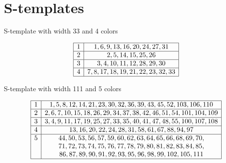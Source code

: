 \documentclass{article}
\newtheorem{computational theorem}[definition]{Computational Theorem}
\begin{document}
\appendix

\section{S-templates}
\label{S-templates}

\begin{table}[H]
{\footnotesize
	\caption{S-template with width 33 and 4 colors}}
\begin{center}
\begin{small}
\[
\begin{array}{|*{2}{c|}}
	\hline
	1 & 1, 6, 9, 13, 16, 20, 24, 27, 31 \\
	\hline
	2 & 2, 5, 14, 15, 25, 26 \\
	\hline
	3 & 3, 4, 10, 11, 12, 28, 29, 30 \\
	\hline
	4 & 7, 8, 17, 18, 19, 21, 22, 23, 32, 33 \\
	\hline
\end{array}
\]
\end{small}
\end{center}
\end{table}

\begin{table}[H]
{\footnotesize
	\caption{S-template with width 111 and 5 colors}}
\begin{center}
\begin{small}
\[
\begin{array}{|*{2}{c|}}
	\hline
	1 & 1, 5, 8, 12, 14 ,21, 23, 30, 32, 36, 39, 43, 45, 52, 103, 106, 110 \\
	\hline
	2 & 2, 6, 7, 10, 15, 18, 26, 29, 34, 37, 38, 42, 46, 51, 54, 101, 104, 109 \\
	\hline
	3 & 3, 4, 9, 11, 17, 19, 25, 27, 33, 35, 40, 41, 47, 48, 55, 100, 107, 108 \\
	\hline
	4 & 13, 16, 20, 22, 24, 28, 31, 58, 61, 67, 88, 94, 97 \\
	\hline
	5 & 44, 50, 53, 56, 57, 59, 60, 62, 63, 64, 65, 66, 68, 69, 70,\\
	& 71, 72, 73, 74, 75, 76, 77, 78, 79, 80, 81, 82, 83, 84, 85,\\
	& 86, 87, 89, 90, 91, 92, 93, 95, 96, 98, 99, 102, 105, 111 \\
	\hline
\end{array}
\]
\end{small}
\end{center}
\end{table}
\end{document}
